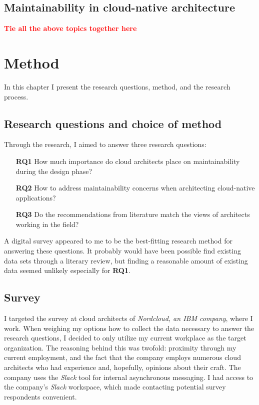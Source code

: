 \documentclass[utf8,english]{gradu3}
\newcommand{\todo}[1]{\textbf{\textcolor{red}{#1}}}
\begin{document}
\section{Maintainability in cloud-native architecture}
\todo{Tie all the above topics together here}

\chapter{Method}
\label{chapter:method}

In this chapter I present the research questions, method, and the research process.

\section{Research questions and choice of method}

Through the research, I aimed to answer three research questions:
\begin{itemize}
  \item [\textbf{RQ1}] How much importance do cloud architects place on
        maintainability during the design phase?
  \item [\textbf{RQ2}] How to address maintainability concerns when architecting
        cloud-native applications?
  \item [\textbf{RQ3}] Do the recommendations from literature match the views of
        architects working in the field?
\end{itemize}

A digital survey appeared to me to be the best-fitting research method for
answering these questions.  It probably would have been possible find existing
data sets through a literary review, but finding a reasonable amount of existing
data seemed unlikely especially for \textbf{RQ1}.

\section{Survey}

I targeted the survey at cloud architects of \textit{Nordcloud, an IBM company},
where I work.  When weighing my options how to collect the data necessary to
answer the research questions, I decided to only utilize my current workplace as
the target organization.  The reasoning behind this was twofold: proximity
through my current employment, and the fact that the company employs numerous
cloud architects who had experience and, hopefully, opinions about their craft.
The company uses the \textit{Slack} tool for internal asynchronous messaging.  I
had access to the company's \textit{Slack} workspace, which made contacting
potential survey respondents convenient.
\end{document}
